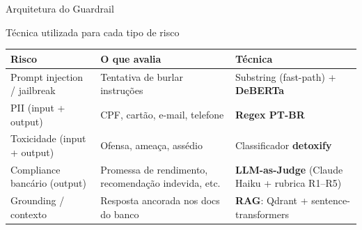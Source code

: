 \documentclass[aspectratio=169,11pt]{beamer}
\begin{document}
\begin{frame}{Arquitetura do Guardrail}
  \begin{center}Técnica utilizada para cada tipo de risco\end{center}
  \vspace{0.3em}
  \small
  \begin{center}
  \begin{tabular}{@{}p{3.4cm}p{4.4cm}p{4.6cm}@{}}
    \toprule
    \textbf{Risco} & \textbf{O que avalia} & \textbf{Técnica}\\
    \midrule
    Prompt injection / jailbreak & Tentativa de burlar instruções & Substring (fast-path) + \textbf{DeBERTa}\\
    PII (input + output) & CPF, cartão, e-mail, telefone & \textbf{Regex PT-BR}\\
    Toxicidade (input + output) & Ofensa, ameaça, assédio & Classificador \textbf{detoxify}\\
    Compliance bancário (output) & Promessa de rendimento, recomendação indevida, etc. & \textbf{LLM-as-Judge} (Claude Haiku + rubrica R1--R5)\\
    Grounding / contexto & Resposta ancorada nos docs do banco & \textbf{RAG}: Qdrant + sentence-transformers\\
    \bottomrule
  \end{tabular}
  \end{center}
\end{frame}
\end{document}

